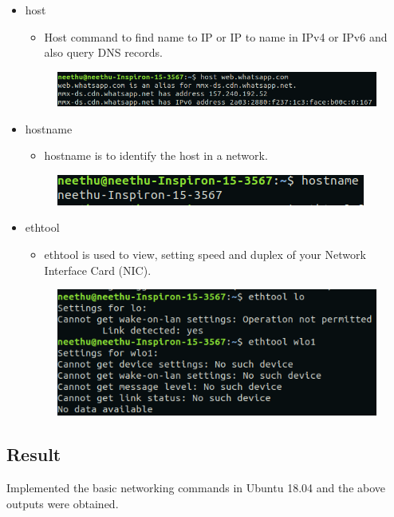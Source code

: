 \begin{itemize}
\begin{figure}[h]
        \end{figure}
    \item host
        \begin{itemize}
            \item Host command to find name to IP or IP to name in IPv4 or IPv6 and also query DNS records.
        \end{itemize}
        \begin{figure}[h]
            \centering
            \includegraphics[scale=0.7]{img/e19.png}
        \end{figure}
    \item hostname
        \begin{itemize}
            \item hostname is to identify the host in a network. 
        \end{itemize}
        \begin{figure}[h]
            \centering
            \includegraphics[scale=0.8]{img/e110.png}
        \end{figure}
    \item ethtool
        \begin{itemize}
            \item ethtool is used to view, setting speed and duplex of your Network Interface Card (NIC).
        \end{itemize}
        \begin{figure}[h]
            \centering
            \includegraphics[scale=0.75]{img/e111.png}
        \end{figure}
    
\end{itemize}


\subsection{Result}
Implemented the basic networking commands in Ubuntu 18.04 and the above outputs were obtained.